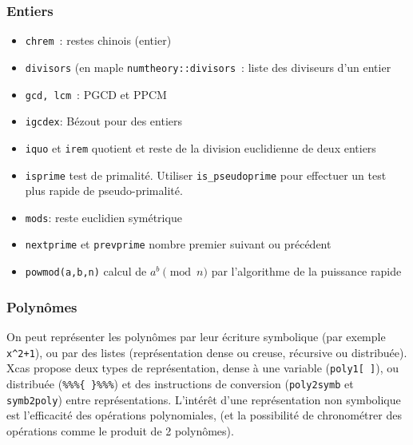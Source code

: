 \documentclass[a4paper,11pt]{article}
\begin{document}
\subsubsection{Entiers}
\begin{itemize}
\item \verb|chrem|~:
restes chinois (entier)
\item \verb|divisors|
(en maple \verb|numtheory::divisors|~:
liste des diviseurs d'un entier
\item \verb|gcd, lcm|~: PGCD et PPCM
\item \verb|igcdex|: Bézout pour des entiers
\item \verb|iquo| et \verb|irem| quotient et reste de la division 
euclidienne de deux entiers
\item \verb|isprime| test de primalit\'e. 
Utiliser \verb|is_pseudoprime| pour effectuer un test plus rapide
de pseudo-primalit\'e.
\item \verb|mods|: reste euclidien symétrique
\item \verb|nextprime| et \verb|prevprime| 
nombre premier suivant ou pr\'ec\'edent
\item \verb|powmod(a,b,n)| %
calcul de $a^b \pmod n$ par
l'algorithme de la puissance rapide
\end{itemize}

\subsubsection{Polyn\^omes}
On peut repr\'esenter les polyn\^omes par leur \'ecriture symbolique
(par exemple \verb|x^2+1|), ou par des listes (repr\'esentation dense
ou creuse, r\'ecursive ou distribu\'ee). 
Xcas propose deux types
de repr\'esentation, dense \`a une variable (\verb|poly1[ ]|), ou
distribu\'ee (\verb|%%%{ }%%%|) et des instructions de conversion
(\verb|poly2symb| et \verb|symb2poly|) entre repr\'esentations.
L'int\'er\^et d'une repr\'esentation
non symbolique est l'efficacit\'e des op\'erations polynomiales, (et la
possibilit\'e de chronom\'etrer des op\'erations comme le produit
de 2 polyn\^omes).
\end{document}
